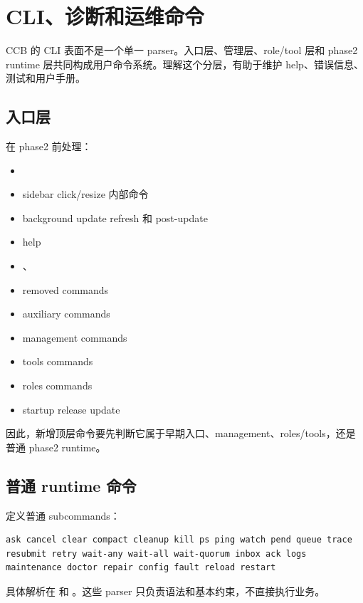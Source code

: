 \chapter{CLI、诊断和运维命令}

CCB 的 CLI 表面不是一个单一 parser。入口层、管理层、role/tool 层和 phase2 runtime 层共同构成用户命令系统。理解这个分层，有助于维护 help、错误信息、测试和用户手册。

\section{入口层}

 在 phase2 前处理：

\begin{itemize}
  \item {}
  \item sidebar click/resize 内部命令
  \item background update refresh 和 post-update
  \item help
  \item {}、
  \item removed commands
  \item auxiliary commands
  \item management commands
  \item tools commands
  \item roles commands
  \item startup release update
\end{itemize}

因此，新增顶层命令要先判断它属于早期入口、management、roles/tools，还是普通 phase2 runtime。

\section{普通 runtime 命令}

 定义普通 subcommands：

\begin{lstlisting}
ask cancel clear compact cleanup kill ps ping watch pend queue trace
resubmit retry wait-any wait-all wait-quorum inbox ack logs
maintenance doctor repair config fault reload restart
\end{lstlisting}

具体解析在  和 。这些 parser 只负责语法和基本约束，不直接执行业务。

